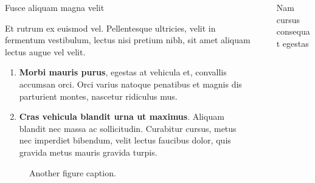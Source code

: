 \documentclass[final]{beamer}
\newlength{\sepwidth}
\newlength{\colwidth}
\newcommand{\separatorcolumn}{\begin{column}{\sepwidth}\end{column}}
\begin{document}
\begin{frame}[t]
\begin{columns}[t]
\begin{column}{\colwidth}
      \begin{block}{Fusce aliquam magna velit}

        Et rutrum ex euismod vel. Pellentesque ultricies, velit in fermentum
        vestibulum, lectus nisi pretium nibh, sit amet aliquam lectus augue vel
        velit.

        \begin{enumerate}
          \item \textbf{Morbi mauris purus}, egestas at vehicula et, convallis
          accumsan orci. Orci varius natoque penatibus et magnis dis parturient
          montes, nascetur ridiculus mus.
          \item \textbf{Cras vehicula blandit urna ut maximus}. Aliquam blandit nec
          massa ac sollicitudin. Curabitur cursus, metus nec imperdiet bibendum,
          velit lectus faucibus dolor, quis gravida metus mauris gravida turpis.
        \end{enumerate}

        \begin{figure}
          \centering
          \caption{Another figure caption.}
        \end{figure}

      \end{block}

    \end{column}

    \separatorcolumn

    \begin{column}{\colwidth}

      \begin{block}{Nam cursus consequat egestas}


\end{block}
\end{column}
\end{columns}
\end{frame}
\end{document}
